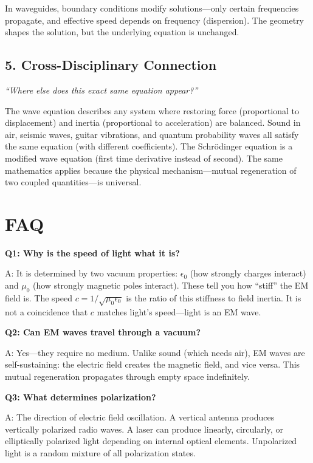 \documentclass[11pt,openright]{book}
\begin{document}
In waveguides, boundary conditions modify solutions---only certain frequencies propagate, and effective speed depends on frequency (dispersion). The geometry shapes the solution, but the underlying equation is unchanged.

\subsection*{5. Cross-Disciplinary Connection}
\textit{``Where else does this exact same equation appear?''}

The wave equation describes any system where restoring force (proportional to displacement) and inertia (proportional to acceleration) are balanced. Sound in air, seismic waves, guitar vibrations, and quantum probability waves all satisfy the same equation (with different coefficients). The Schr\"odinger equation is a modified wave equation (first time derivative instead of second). The same mathematics applies because the physical mechanism---mutual regeneration of two coupled quantities---is universal.


\section*{FAQ}

\textbf{Q1: Why is the speed of light what it is?}

A: It is determined by two vacuum properties: $\epsilon_0$ (how strongly charges interact) and $\mu_0$ (how strongly magnetic poles interact). These tell you how ``stiff'' the EM field is. The speed $c = 1/\sqrt{\mu_0 \epsilon_0}$ is the ratio of this stiffness to field inertia. It is not a coincidence that $c$ matches light's speed---light is an EM wave.

\textbf{Q2: Can EM waves travel through a vacuum?}

A: Yes---they require no medium. Unlike sound (which needs air), EM waves are self-sustaining: the electric field creates the magnetic field, and vice versa. This mutual regeneration propagates through empty space indefinitely.

\textbf{Q3: What determines polarization?}

A: The direction of electric field oscillation. A vertical antenna produces vertically polarized radio waves. A laser can produce linearly, circularly, or elliptically polarized light depending on internal optical elements. Unpolarized light is a random mixture of all polarization states.
\end{document}
